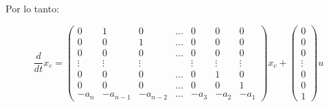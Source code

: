         Por lo tanto:

        \begin{equation}
            \frac{d}{dt} x_c =
            \begin{pmatrix}
            0 & 1 & 0 & \dots & 0 & 0 & 0 \\
            0 & 0 & 1 & \dots & 0 & 0 & 0 \\
            0 & 0 & 0 & \dots & 0 & 0 & 0 \\
            \vdots & \vdots & \vdots & & \vdots & \vdots & \vdots \\
            0 & 0 & 0 & \dots & 0 & 1 & 0 \\
            0 & 0 & 0 & \dots & 0 & 0 & 1 \\
            -a_{n} & -a_{n-1} & -a_{n-2} & \dots & -a_{3} & -a_{2} & -a_{1}
            \end{pmatrix} x_c +
            \begin{pmatrix}
            0 \\
            0 \\
            0 \\
            \vdots \\
            0 \\
            0 \\
            1
            \end{pmatrix} u
        \end{equation}

